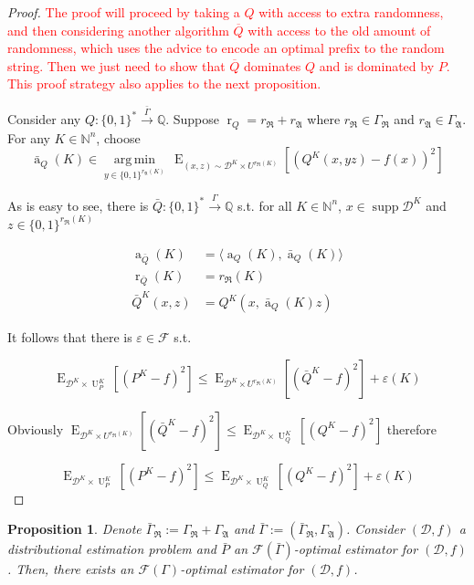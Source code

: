 \documentclass[11pt]{article}
\numberwithin{equation}{section}
\theoremstyle{definition}
\theoremstyle{plain}
\newtheorem{proposition}{Proposition}[section]
\newcommand{\Bool}{\{0,1\}}
\newcommand{\Words}{{\Bool^*}}
\newcommand{\WordsLen}[1]{{\Bool^{#1}}}
\DeclareMathOperator{\Supp}{supp}
\DeclareMathOperator{\E}{E}
\DeclareMathOperator{\R}{r}
\DeclareMathOperator{\A}{a}
\DeclareMathOperator{\Un}{U}
\newcommand{\Argmin}[1]{\underset{#1}{\operatorname{arg\,min}}\,}
\newcommand{\Nats}{\mathbb{N}}
\newcommand{\Rats}{\mathbb{Q}}
\newcommand{\Chev}[1]{\langle #1 \rangle}
\newcommand{\Dist}{\mathcal{D}}
\newcommand{\GrowR}{\Gamma_{\mathfrak{R}}}
\newcommand{\GrowA}{\Gamma_{\mathfrak{A}}}
\newcommand{\Fall}{\mathcal{F}}
\newcommand{\EG}{\Fall(\Gamma)}
\newcommand{\Scheme}{\xrightarrow{\Gamma}}
\begin{document}
\begin{proof}

\textcolor{red}{The proof will proceed by taking a $Q$ with access to extra randomness, and then considering another algorithm $\overline{Q}$ with access to the old amount of randomness, which uses the advice to encode an optimal prefix to the random string. Then we just need to show that $\overline{Q}$ dominates $Q$ and is dominated by $P$. This proof strategy also applies to the next proposition.}

Consider any $Q: \Words \xrightarrow{\bar{\Gamma}} \Rats$. Suppose $\R_Q=r_{\mathfrak{R}}+r_{\mathfrak{A}}$ where $r_{\mathfrak{R}} \in \GrowR$ and $r_{\mathfrak{A}} \in \GrowA$. For any $K \in \Nats^n$, choose 
\[\bar{\A}_Q(K) \in \Argmin{y \in \WordsLen{r_{\mathfrak{A}}(K)}} \E_{(x,z) \sim \Dist^{K} \times U^{r_{\mathfrak{R}}(K)}}[(Q^{K}(x,yz) - f(x))^2]\]

As is easy to see, there is $\bar{Q}: \Words \Scheme \Rats$ s.t. for all $K \in \Nats^n$, $x \in \Supp \Dist^{K}$ and $z \in \WordsLen{r_{\mathfrak{R}}(K)}$

\begin{align*}
\A_{\bar{Q}}(K)&=\Chev{\A_Q(K),\bar{\A}_Q(K)} \\
\R_{\bar{Q}}(K) &= r_{\mathfrak{R}}(K) \\
\bar{Q}^{K}(x,z)&=Q^{K}(x,\bar{\A}_Q(K)z)
\end{align*}

It follows that there is $\varepsilon \in \Fall$ s.t.

$$\E_{\Dist^{K} \times \Un_P^{K}}[(P^{K} - f)^2] \leq \E_{\Dist^{K} \times U^{r_{\mathfrak{R}}(K)}}[(\bar{Q}^{K} - f)^2] + \varepsilon(K)$$

Obviously $\E_{\Dist^{K} \times U^{r_{\mathfrak{R}}(K)}}[(\bar{Q}^{K} - f)^2] \leq \E_{\Dist^{K} \times \Un_Q^{K}}[(Q^{K} - f)^2]$ therefore

$$\E_{\Dist^{K} \times \Un_P^{K}}[(P^{K} - f)^2] \leq \E_{\Dist^{K} \times \Un_Q^{K}}[(Q^{K} - f)^2] + \varepsilon(K)$$
\end{proof}

\begin{proposition}

Denote $\bar{\Gamma}_{\mathfrak{R}}:=\GrowR+\GrowA$ and $\bar{\Gamma}:=(\bar{\Gamma}_{\mathfrak{R}},\GrowA)$. Consider $(\Dist,f)$ a distributional estimation problem and $\bar{P}$ an $\Fall(\bar{\Gamma})$-optimal estimator for $(\Dist,f)$. Then, there exists an $\EG$-optimal estimator for $(\Dist,f)$.

\end{proposition}
\end{document}
